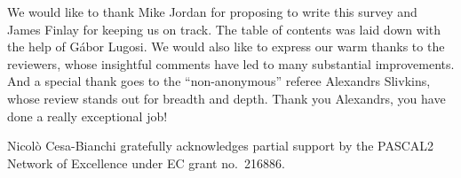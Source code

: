 \documentclass[11pt]{hackednow}
\begin{document}
\begin{acknowledgements}
We would like to thank Mike Jordan for proposing to write this survey and James Finlay for keeping us on track. The table of contents was laid down with the help of G\'abor Lugosi.
We would also like to express our warm thanks to the reviewers, whose insightful comments have led to many substantial improvements. And a special thank goes to the ``non-anonymous'' referee Alexandrs Slivkins, whose review stands out for breadth and depth. Thank you Alexandrs, you have done a really exceptional job!

Nicol\`o Cesa-Bianchi gratefully acknowledges partial support by the PASCAL2 Network of Excellence under EC grant no.\ 216886.
\end{acknowledgements}


%

\end{document}
